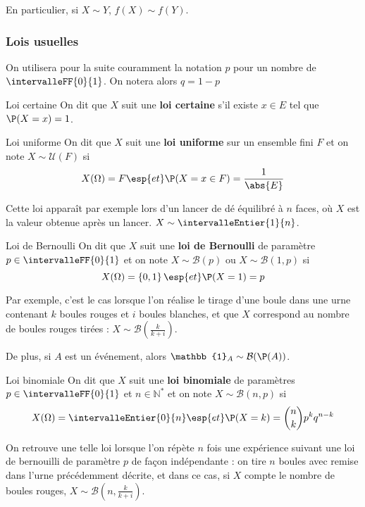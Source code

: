     En particulier, si $X \sim Y$, $f(X) \sim f(Y)$.

    \subsubsection{Lois usuelles}

    On utilisera pour la suite couramment la notation $p$ pour un nombre de $\intervalleFF{0}{1}$. On notera alors $q = 1 - p$

    \begin{defi}{Loi certaine}{}
        On dit que $X$ suit une \textbf{loi certaine} s’il existe $x \in E$ tel que $\P(X = x) = 1$.
    \end{defi}

    \begin{defi}{Loi uniforme}{}
        On dit que $X$ suit une \textbf{loi uniforme} sur un ensemble fini $F$ et on note $X \sim \mathcal{U}(F)$ si 
        \[ X(\Omega) = F \esp{et} \P(X = x \in F) = \frac{1}{\abs{E}} \]     
    \end{defi}

    Cette loi apparaît par exemple lors d’un lancer de dé équilibré à $n$ faces, où $X$ est la valeur obtenue après un lancer. $X \sim \intervalleEntier{1}{n}$.

    \begin{defi}{Loi de Bernoulli}{}
        On dit que $X$ suit une \textbf{loi de Bernoulli} de paramètre $p \in \intervalleFF{0}{1}$ et on note $X \sim \mathcal{B}(p)$ ou $X \sim \mathcal{B}(1,p)$ si 
        \[ X(\Omega) = \left\{0,1\right\} \esp{et} \P(X = 1) = p \]   
    \end{defi}

    Par exemple, c’est le cas lorsque l’on réalise le tirage d’une boule dans une urne contenant $k$ boules rouges et $i$ boules blanches, et que $X$ correspond au nombre de boules rouges tirées : $X \sim \mathcal{B}(\frac{k}{k + i})$. 

    De plus, si $A$ est un événement, alors $\mathbb{1}_A \sim \mathcal{B}(\P(A))$.

    \begin{defi}{Loi binomiale}{}
        On dit que $X$ suit une \textbf{loi binomiale} de paramètres $p \in \intervalleFF{0}{1}$ et $n \in \mathbb{N}^*$ et on note $X \sim \mathcal{B}(n,p)$ si 
        \[ X(\Omega) = \intervalleEntier{0}{n} \esp{et} \P(X = k) = \binom{n}{k}p^k q^{n-k} \]   
    \end{defi}

    On retrouve une telle loi lorsque l’on répète $n$ fois une expérience suivant une loi de bernouilli de paramètre $p$ de façon indépendante : on tire $n$ boules avec remise dans l’urne précédemment décrite, et dans ce cas, si $X$ compte le nombre de boules rouges, $X \sim \mathcal{B}(n, \frac{k}{k + i})$.


